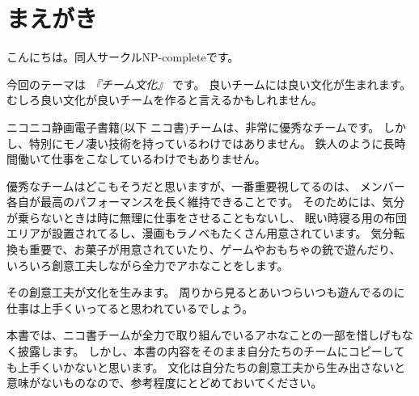 \section{まえがき}

こんにちは。同人サークルNP-completeです。

今回のテーマは \emph{『チーム文化』} です。
良いチームには良い文化が生まれます。
むしろ良い文化が良いチームを作ると言えるかもしれません。

ニコニコ静画電子書籍(以下 ニコ書)チームは、非常に優秀なチームです。
しかし、特別にモノ凄い技術を持っているわけではありません。
鉄人のように長時間働いて仕事をこなしているわけでもありません。

優秀なチームはどこもそうだと思いますが、一番重要視してるのは、
メンバー各自が最高のパフォーマンスを長く維持できることです。
そのためには、気分が乗らないときは時に無理に仕事をさせることもないし、
眠い時寝る用の布団エリアが設置されてるし、漫画もラノベもたくさん用意されています。
気分転換も重要で、お菓子が用意されていたり、ゲームやおもちゃの銃で遊んだり、
いろいろ創意工夫しながら全力でアホなことをします。

その創意工夫が文化を生みます。
周りから見るとあいつらいつも遊んでるのに仕事は上手くいってると思われているでしょう。

本書では、ニコ書チームが全力で取り組んでいるアホなことの一部を惜しげもなく披露します。
しかし、本書の内容をそのまま自分たちのチームにコピーしても上手くいかないと思います。
文化は自分たちの創意工夫から生み出さないと意味がないものなので、参考程度にとどめておいてください。
